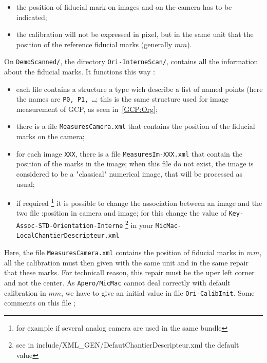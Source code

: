 \begin{itemize}
   \item the position of fiducial mark on images and on the camera has to be indicated;
   \item the calibration will not be expressed in pixel, but in the same unit
         that the position of the reference fiducial marks (generally $mm$).
\end{itemize}

On {\tt DemoScanned/}, the directory {\tt Ori-InterneScan/}, contains all the information
about the fiducial marks. It functions this way :

\begin{itemize}
    \item each file contains a structure a type {\tt <MesureAppuiFlottant1Im>} wich describe a list
          of named points (here the names are {\tt P0, P1, \dots}; this is the same structure used
          for image measurement of GCP, as seen in~\ref{GCP:Org};

     \item there is a file {\tt MeasuresCamera.xml} that contains the position of the fiducial marks
          on the camera;

     \item for each image {\tt XXX}, there is a file {\tt MeasuresIm-XXX.xml} that contain the position
           of the marks in the image; when this file do not exist, the image is considered to be a "classical"
           numerical image, that will be processed as usual;

     \item if required \footnote{for example if several analog camera are used in the same bundle}
           it is possible to change the association between an image and the two file :position in  camera
           and image; for this change the  value of {\tt Key-Assoc-STD-Orientation-Interne}
           \footnote{see in include/XML\_GEN/DefautChantierDescripteur.xml the default value}
           in your {\tt MicMac-LocalChantierDescripteur.xml}
\end{itemize}

Here, the file {\tt MeasuresCamera.xml} contains the position of fiducial marks in $mm$,
all the calibration  must then given with the same unit and in the same repair that these
marks. For technicall reason, this repair must be the uper left corner and not the center.
As {\tt Apero/MicMac} cannot deal correctly with default calibration in $mm$, we
have to give an initial value in file {\tt Ori-CalibInit}. Some comments on this file ;

